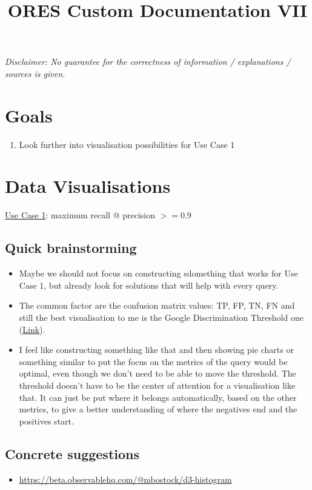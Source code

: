 \documentclass[12pt,a4paper]{article}
\title{ORES Custom Documentation VII}
\date{}
\def\checkmark{\tikz\fill[scale=0.4](0,.35) -- (.25,0) -- (1,.7) -- (.25,.15) -- cycle;}
\begin{document}
\maketitle
\textit{Disclaimer: No guarantee for the correctness of information / explanations / sources is given.}\\
%
%
%
\section*{Goals}
\begin{enumerate}
\item Look further into visualisation possibilities for Use Case 1
\end{enumerate}
\section{Data Visualisations}
\underline{Use Case 1}: maximum recall @ precision $>=0.9$\\
%
\subsection{Quick brainstorming}
\begin{itemize}
\item Maybe we should not focus on constructing sdomething that works for Use Case 1, but already look for solutions that will help with every query.
\item The common factor are the confusion matrix values: TP, FP, TN, FN and still the best visualisation to me is the Google Discrimination Threshold one (\href{https://research.google.com/bigpicture/attacking-discrimination-in-ml/}{Link}).
\item I feel like constructing something like that and then showing pie charts or something similar to put the focus on the metrics of the query would be optimal, even though we don't need to be able to move the threshold. The threshold doesn't have to be the center of attention for a visualisation like that. It can just be put where it belongs automatically, based on the other metrics, to give a better understanding of where the negatives end and the positives start. 
\end{itemize}
%
\subsection{Concrete suggestions}
\begin{itemize}
\item \url{https://beta.observablehq.com/@mbostock/d3-histogram}
\end{itemize}
%
%
%
\end{document}
